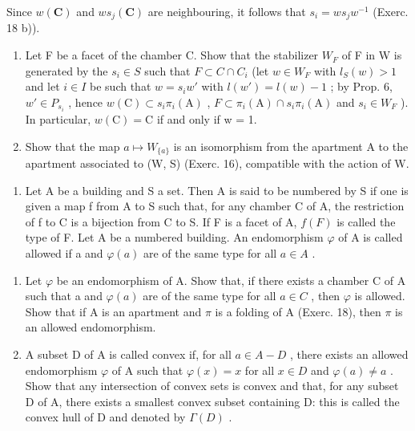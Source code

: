 Since \(w(\mathbf{C})\) and \(ws_{j}(\mathbf{C})\) are neighbouring, it follows that \(s_i = ws_jw^{-1}\) (Exerc. 18 b)).

\begin{enumerate}
\def\labelenumi{\alph{enumi})}
\setcounter{enumi}{2}
\item
  Let F be a facet of the chamber C. Show that the stabilizer \(W_{F}\) of F in W is generated by the \(s_{i} \in S\) such that \(F \subset C \cap C_{i}\) (let \(w \in W_{F}\) with \(l_{S}(w) > 1\) and let \(i \in I\) be such that \(w = s_{i}w'\) with \(l(w') = l(w) - 1\) ; by Prop. 6, \(w' \in P_{s_{i}}\) , hence \(w(\mathrm{C}) \subset s_{i}\pi_{i}(\mathrm{A})\) , \(F \subset \pi_{i}(\mathrm{A}) \cap s_{i}\pi_{i}(\mathrm{A})\) and \(s_{i} \in W_{F}\) ). In particular, \(w(\mathrm{C}) = \mathrm{C}\) if and only if w = 1.
\item
  Show that the map \(a \mapsto W_{\{a\}}\) is an isomorphism from the apartment A to the apartment associated to (W, S) (Exerc. 16), compatible with the action of W.
\end{enumerate}

\begin{enumerate}
\def\labelenumi{\arabic{enumi})}
\setcounter{enumi}{19}
\tightlist
\item
  Let A be a building and S a set. Then A is said to be numbered by S if one is given a map f from A to S such that, for any chamber C of A, the restriction of f to C is a bijection from C to S. If F is a facet of A, \(f(F)\) is called the type of F. Let A be a numbered building. An endomorphism \(\varphi\) of A is called allowed if a and \(\varphi(a)\) are of the same type for all \(a \in A\) .
\end{enumerate}

\begin{enumerate}
\def\labelenumi{\alph{enumi})}
\item
  Let \(\varphi\) be an endomorphism of A. Show that, if there exists a chamber C of A such that a and \(\varphi(a)\) are of the same type for all \(a \in C\) , then \(\varphi\) is allowed. Show that if A is an apartment and \(\pi\) is a folding of A (Exerc. 18), then \(\pi\) is an allowed endomorphism.
\item
  A subset D of A is called convex if, for all \(a \in A - D\) , there exists an allowed endomorphism \(\varphi\) of A such that \(\varphi(x) = x\) for all \(x \in D\) and \(\varphi(a) \neq a\) . Show that any intersection of convex sets is convex and that, for any subset D of A, there exists a smallest convex subset containing D: this is called the convex hull of D and denoted by \(\Gamma(D)\) .
\end{enumerate}

